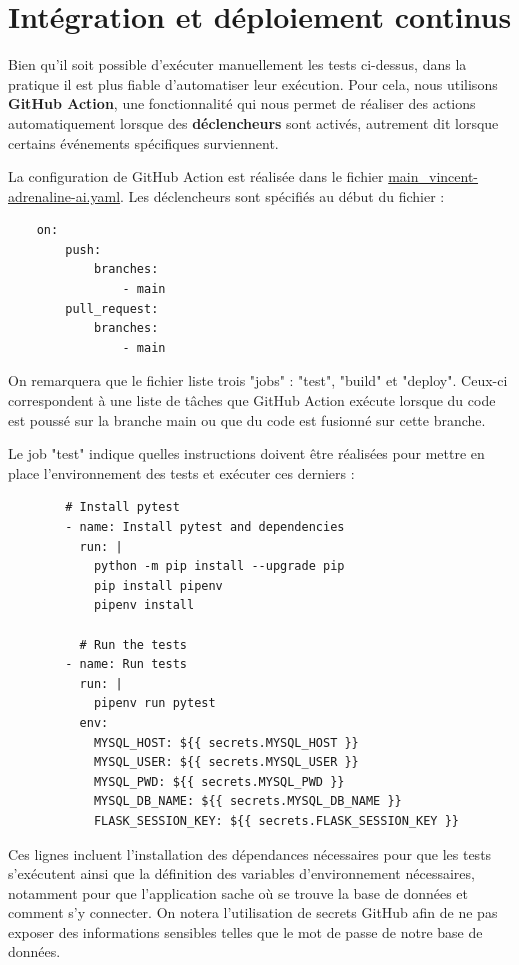 \documentclass[french]{article}
\begin{document}
    \section{Intégration et déploiement continus}

    Bien qu'il soit possible d'exécuter manuellement les tests ci-dessus, dans la pratique il est plus fiable d'automatiser leur exécution. Pour cela, nous utilisons \textbf{GitHub Action}, une fonctionnalité qui nous permet de réaliser des actions automatiquement lorsque des \textbf{déclencheurs} sont activés, autrement dit lorsque certains événements spécifiques surviennent.

    La configuration de GitHub Action est réalisée dans le fichier \href{https://github.com/vinpap/adrenaline.ai/blob/main/.github/workflows/main_vincent-adrenaline-ai.yml}{main\_vincent-adrenaline-ai.yaml}. Les déclencheurs sont spécifiés au début du fichier :

    \begin{verbatim}
    on:
        push:
            branches:
                - main
        pull_request:
            branches:
                - main
    \end{verbatim}

    On remarquera que le fichier liste trois "jobs" : "test", "build" et "deploy". Ceux-ci correspondent à une liste de tâches que GitHub Action exécute lorsque du code est poussé sur la branche main ou que du code est fusionné sur cette branche. 

    Le job "test" indique quelles instructions doivent être réalisées pour mettre en place l'environnement des tests et exécuter ces derniers :

    \begin{verbatim}
        # Install pytest
        - name: Install pytest and dependencies
          run: |
            python -m pip install --upgrade pip
            pip install pipenv
            pipenv install
  
          # Run the tests
        - name: Run tests
          run: |
            pipenv run pytest
          env: 
            MYSQL_HOST: ${{ secrets.MYSQL_HOST }}
            MYSQL_USER: ${{ secrets.MYSQL_USER }}
            MYSQL_PWD: ${{ secrets.MYSQL_PWD }}
            MYSQL_DB_NAME: ${{ secrets.MYSQL_DB_NAME }}
            FLASK_SESSION_KEY: ${{ secrets.FLASK_SESSION_KEY }}
    \end{verbatim}

    Ces lignes incluent l'installation des dépendances nécessaires pour que les tests s'exécutent ainsi que la définition des variables d'environnement nécessaires, notamment pour que l'application sache où se trouve la base de données et comment s'y connecter. On notera l'utilisation de secrets GitHub afin de ne pas exposer des informations sensibles telles que le mot de passe de notre base de données.
\end{document}
